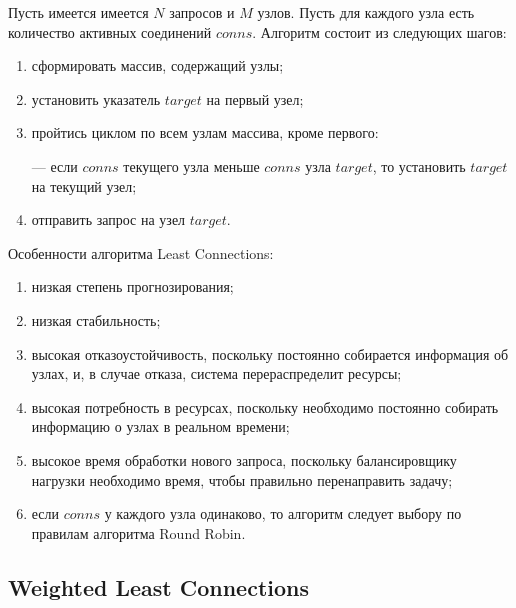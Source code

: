 Пусть имеется имеется $N$ запросов и $M$ узлов. Пусть для каждого узла есть количество активных соединений $conns$.
Алгоритм состоит из следующих шагов:

\begin{enumerate}
	\item сформировать массив, содержащий узлы;
	\item установить указатель $target$ на первый узел;
	\item пройтись циклом по всем узлам массива, кроме первого:
	
	--- если $conns$ текущего узла меньше $conns$ узла $target$, то установить $target$ на текущий узел; 
	
	\item отправить запрос на узел $target$.
\end{enumerate}


Особенности алгоритма Least Connections:
\begin{enumerate}[label=---]
	\item низкая степень прогнозирования; 
	\item низкая стабильность;
	\item высокая отказоустойчивость, поскольку постоянно собирается информация об узлах, и, в случае отказа, система перераспределит ресурсы;
	\item высокая потребность в ресурсах, поскольку необходимо постоянно собирать информацию о узлах в реальном времени;
	\item высокое время обработки нового запроса, поскольку балансировщику нагрузки необходимо время, чтобы правильно перенаправить задачу;
	\item если $conns$ у каждого узла одинаково, то алгоритм следует выбору по правилам алгоритма Round Robin.
\end{enumerate}


\begin{comment}
Балансировка нагрузки по наименьшему количеству подключений --- это алгоритм динамической балансировки нагрузки, при котором запросы распределяются узлы с наименьшим количеством активных подключений на момент получения запроса \cite{leastconns}.

\end{comment}


\subsection{Weighted Least Connections}


